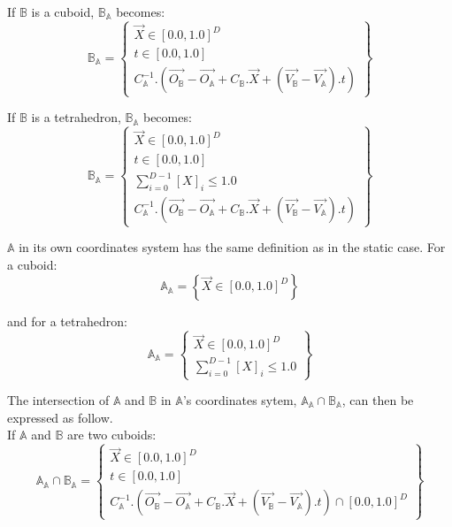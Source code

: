 \documentclass[12pt, a4paper]{article}
\begin{document}
If $\mathbb{B}$ is a cuboid, $\mathbb{B}_\mathbb{A}$ becomes:
\begin{equation}
\mathbb{B}_\mathbb{A}=\left\lbrace
\begin{array}{c}
\overrightarrow{X}\in[0.0,1.0]^D\\
t\in[0.0,1.0]\\
C_\mathbb{A}^{-1}.\left(\overrightarrow{O_\mathbb{B}}-\overrightarrow{O_\mathbb{A}}+C_\mathbb{B}.\overrightarrow{X}+\left(\overrightarrow{V_\mathbb{B}}-\overrightarrow{V_\mathbb{A}}\right).t\right)
\end{array}
\right\rbrace
\end{equation}

If $\mathbb{B}$ is a tetrahedron, $\mathbb{B}_\mathbb{A}$ becomes:
\begin{equation}
\mathbb{B}_\mathbb{A}=\left\lbrace
\begin{array}{c}
\overrightarrow{X}\in[0.0,1.0]^D\\
t\in[0.0,1.0]\\
\sum_{i=0}^{D-1}\left[X\right]_i\le1.0\\
C_\mathbb{A}^{-1}.\left(\overrightarrow{O_\mathbb{B}}-\overrightarrow{O_\mathbb{A}}+C_\mathbb{B}.\overrightarrow{X}+\left(\overrightarrow{V_\mathbb{B}}-\overrightarrow{V_\mathbb{A}}\right).t\right)
\end{array}
\right\rbrace
\end{equation}

$\mathbb{A}$ in its own coordinates system has the same definition as in the static case. For a cuboid:
\begin{equation}
\mathbb{A}_\mathbb{A}=\left\lbrace\overrightarrow{X}\in[0.0,1.0]^D\right\rbrace
\end{equation}

and for a tetrahedron:
\begin{equation}
\mathbb{A}_\mathbb{A}=\left\lbrace
\begin{array}{c}
\overrightarrow{X}\in[0.0,1.0]^D\\
\sum_{i=0}^{D-1}\left[X\right]_i\le1.0\end{array}
\right\rbrace
\end{equation}

The intersection of $\mathbb{A}$ and $\mathbb{B}$ in $\mathbb{A}$'s coordinates sytem, $\mathbb{A}_\mathbb{A}\cap\mathbb{B}_\mathbb{A}$, can then be expressed as follow.\\

If $\mathbb{A}$ and $\mathbb{B}$ are two cuboids:
\begin{equation}
\mathbb{A}_\mathbb{A}\cap\mathbb{B}_\mathbb{A}=\left\lbrace
\begin{array}{c}
\overrightarrow{X}\in[0.0,1.0]^D\\
t\in[0.0,1.0]\\
C_\mathbb{A}^{-1}.\left(\overrightarrow{O_\mathbb{B}}-\overrightarrow{O_\mathbb{A}}+C_\mathbb{B}.\overrightarrow{X}+\left(\overrightarrow{V_\mathbb{B}}-\overrightarrow{V_\mathbb{A}}\right).t\right)\cap[0.0,1.0]^D
\end{array}
\right\rbrace
\end{equation}
\end{document}
